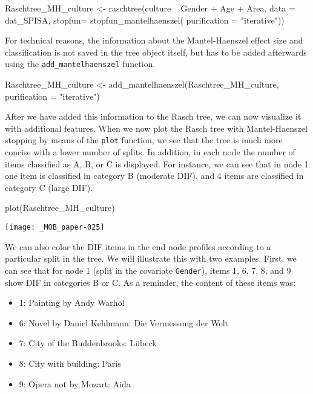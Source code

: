 \documentclass[doc,floatsintext,natbib]{apa7}
\begin{document}
\begin{Schunk}
\begin{Sinput}
 Raschtree_MH_culture <- raschtree(culture ~  Gender + Age + Area,
                                   data = dat_SPISA,
                                   stopfun= stopfun_mantelhaenszel(
                                     purification = "iterative"))
\end{Sinput}
\end{Schunk}

For technical reasons, the information about the Mantel-Haenszel effect size and classification is not saved in the tree object itself, but has to be added afterwards using the \texttt{add\_mantelhaenszel} function.

\begin{Schunk}
\begin{Sinput}
 Raschtree_MH_culture <- add_mantelhaenszel(Raschtree_MH_culture,
                                            purification = "iterative")
\end{Sinput}
\end{Schunk}

After we have added this information to the Rasch tree, we can now visualize it with additional features. When we now plot the Rasch tree with Mantel-Haenszel stopping by means of the \texttt{plot} function, we see that the tree is much more concise with a lower number of splits. In addition, in each node the number of items classified as A, B, or C is displayed. For instance, we can see that in node 1 one item is classified in category B (moderate DIF), and 4 items are classified in category C (large DIF).

\begin{Schunk}
\begin{Sinput}
 plot(Raschtree_MH_culture)
\end{Sinput}
\end{Schunk}
\texttt{[image: \_MOB\_paper-025]}

We can also color the DIF items in the end node profiles according to a particular split in the tree. We will illustrate this with two examples. 
First, we can see that for node 1 (split in the covariate \texttt{Gender}), items 1, 6, 7, 8, and 9 show DIF in categories B or C. As a reminder, the content of these items was:

\begin{itemize}
\item 1: Painting by Andy Warhol
\item 6: Novel by Daniel Kehlmann: Die Vermessung der Welt
\item 7: City of the Buddenbrooks: Lübeck
\item 8: City with building: Paris
\item 9: Opera not by Mozart: Aida
\end{itemize}
\end{document}
